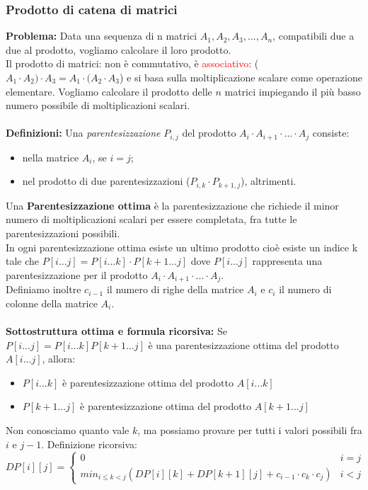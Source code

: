 \documentclass[../cheatSheetAlgoritmi.tex]{subfiles}
\begin{document}
\subsubsection{Prodotto di catena di matrici}
\textbf{Problema:} Data una sequenza di n matrici $A_1, A_2, A_3, ..., A_n$, compatibili due a due al prodotto, vogliamo calcolare il loro prodotto.\\
Il prodotto di matrici: non è commutativo, è \textcolor{red}{associativo}: ($A_1 \cdot A_2) \cdot A_3 = A_1 \cdot (A_2 \cdot A_3$) e si basa sulla moltiplicazione scalare come operazione elementare. Vogliamo calcolare il prodotto delle $n$ matrici impiegando il più basso numero possibile di moltiplicazioni scalari.\\\\
\textbf{Definizioni:} Una \emph{parentesizzazione} $P_{i,j}$ del prodotto $A_i \cdot A_{i+1}\cdot ... \cdot A_j$ consiste:
\begin{itemize}
	\item nella matrice $A_i$, se $i = j$;
	\item nel prodotto di due parentesizzazioni ($P_{i,k} \cdot P_{k+1,j}$), altrimenti.
\end{itemize}
Una \textbf{Parentesizzazione ottima} è la parentesizzazione che richiede il minor numero di moltiplicazioni scalari per essere completata, fra tutte le parentesizzazioni possibili.\\
In ogni parentesizzazione ottima esiste un ultimo prodotto cioè esiste un indice k tale che $P[i...j] = P[i...k] \cdot P[k+1...j]$ dove $P[i...j]$ rappresenta una parentesizzazione per il prodotto $A_i \cdot A_{i+1} \cdot ... \cdot A_j$.\\
Definiamo inoltre $c_{i-1}$ il numero di righe della matrice $A_i$ e $c_{i}$  il numero di colonne della matrice $A_i$.\\\\
\textbf{Sottostruttura ottima e formula ricorsiva:} Se $P[i...j] = P[i...k]P[k+1...j]$ è una parentesizzazione ottima del prodotto $A[i...j]$, allora:
\begin{itemize}
	\item $P[i...k]$ è parentesizzazione ottima del prodotto $A[i...k]$
	\item $P[k+1...j]$ è parentesizzazione ottima del prodotto $A[k+1...j]$
\end{itemize}
Non conosciamo quanto vale $k$, ma possiamo provare per tutti i valori possibili fra $i$ e $j-1$.
Definizione ricorsiva:
\begin{equation*}
  	DP[i][j] =\begin{cases}
    	0 & \text{$i = j$}\\
    	min_{i \leq k < j}(DP[i][k]+DP[k+1][j]+c_{i-1} \cdot c_{k} \cdot c_{j})  & \text{$i < j$}  
  	\end{cases}
\end{equation*}
\end{document}
